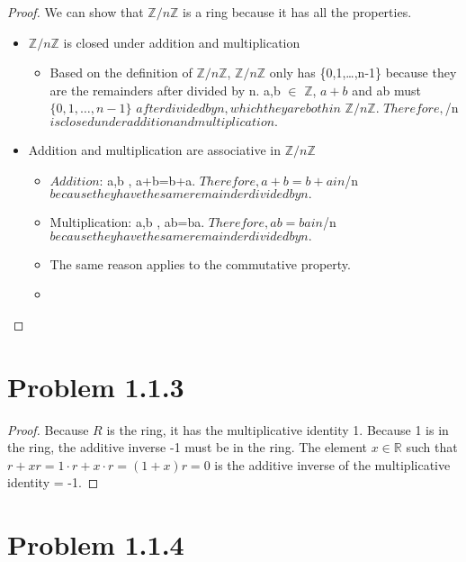 \documentclass[12pt]{article}
\newcommand{\Z}{\mathbb{Z}}
\begin{document}
\begin{proof}
We can show that $\Z/n\Z$ is a ring because it has all the properties.
\begin{itemize}
    \item $\Z/n\Z$ is closed under addition and multiplication
    \begin{itemize}
        \item Based on the definition of $\Z/n\Z$, $\Z/n\Z$ only has \{0,1,\dots,n-1\} because they are the remainders after divided by n. \forall a,b $\in$ $\Z$, $a+b$ and ab must \in 
        $\{0,1,\dots,n-1\}$ $after divided by n, which they are both in$ $\Z/n\Z$.  $Therefore, $\Z/n\Z$ is closed under addition and multiplication.$           
    \end{itemize}
\item Addition and multiplication are associative in $\Z/n\Z$ 
    \begin{itemize}
        \item $Addition$: \forall a,b \in {}, a+b=b+a. $Therefore, a+b=b+a in $/n$ because they have the same remainder divided by n.$
        \\
        \item Multiplication: \forall a,b \in {}, ab=ba. $Therefore, ab=ba in $/n$ because they have the same remainder divided by n.$
    \item The same reason applies to the commutative property.
    \item 
    \end{itemize}
\end{itemize}
\end{proof}

\newpage 

\section{Problem 1.1.3}

\begin{proof}
	Because $R$ is the ring, it has the multiplicative identity 1. Because 1 is in the ring, the additive inverse -1 must be in the ring. The element $x \in \mathbb{R}$ such that $r+xr=1\cdot r+x \cdot r = (1+x)r = 0$ is the additive inverse of the multiplicative identity = -1.
\end{proof}

\newpage 

\section{Problem 1.1.4}
\end{document}
